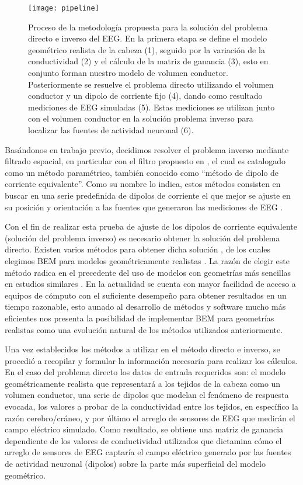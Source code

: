 \begin{figure}[tb]
	\centering
	\texttt{[image: pipeline]}
	\caption{Proceso de la metodología propuesta para la solución del problema directo e inverso del EEG. En la primera etapa se define el modelo geométrico realista de la cabeza (1), seguido por la variación de la conductividad (2) y el cálculo de la matriz de ganancia (3), esto en conjunto forman nuestro modelo de volumen conductor. Posteriormente se resuelve el problema directo utilizando el volumen conductor y un dipolo de corriente fijo (4), dando como resultado mediciones de EEG simuladas (5). Estas mediciones se utilizan junto con el volumen conductor en la solución problema inverso para localizar las fuentes de actividad neuronal (6).
	}
	\label{fig:methodology:pipeline}
\end{figure}

Basándonos en trabajo previo, decidimos resolver el problema inverso mediante filtrado espacial, en particular con el filtro propuesto en \cite{VanVeen1988}, el cual es catalogado como un método paramétrico, también conocido como ``método de dipolo de corriente equivalente''.
Como su nombre lo indica, estos métodos consisten en buscar en una serie predefinida de dipolos de corriente el que mejor se ajuste en su posición y orientación a las fuentes que generaron las mediciones de EEG  \cite{Hallez2007}.

Con el fin de realizar esta prueba de ajuste de los dipolos de corriente equivalente (solución del problema inverso) es necesario obtener la solución del problema directo. Existen varios métodos para obtener dicha solución \cite{Mosher1999}, de los cuales elegimos BEM para modelos geométricamente realistas \cite{Ermer2001}.
La razón de elegir este método radica en el precedente del uso de modelos con geometrías más sencillas en estudios similares \cite{Gutierrez2004}.
En la actualidad se cuenta con mayor facilidad de acceso a equipos de cómputo con el suficiente desempeño para obtener resultados en un tiempo razonable, esto aunado al desarrollo de métodos y software mucho más eficientes \cite{open,Clerc2010} nos presenta la posibilidad de implementar BEM para geometrías realistas como una evolución natural de los métodos utilizados anteriormente.

Una vez establecidos los métodos a utilizar en el método directo e inverso, se procedió a recopilar y formular la información necesaria para realizar los cálculos.
En el caso del problema directo los datos de entrada requeridos son: el modelo geométricamente realista que representará a los tejidos de la cabeza como un volumen conductor, una serie de dipolos que modelan el fenómeno de respuesta evocada, los valores a probar de la conductividad entre los tejidos, en específico la razón cerebro/cráneo, y por último el arreglo de sensores de EEG que medirán el campo eléctrico simulado.
Como resultado, se obtiene una matriz de ganancia dependiente de los valores de conductividad utilizados que dictamina cómo el arreglo de sensores de EEG captaría el campo eléctrico generado por las fuentes de actividad neuronal (dipolos) sobre la parte más superficial del modelo geométrico.

